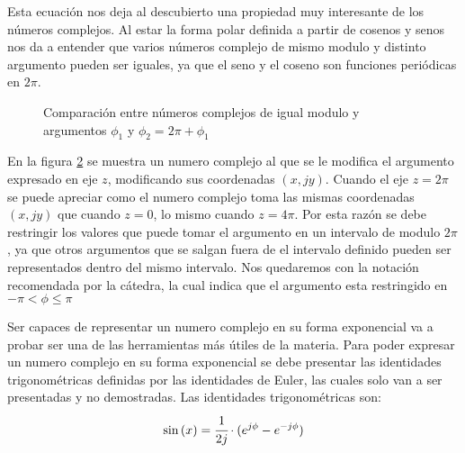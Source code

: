Esta ecuación nos deja al descubierto una propiedad muy interesante de los números complejos. Al estar la forma polar definida a partir de cosenos y senos nos da a entender que varios números complejo de mismo modulo y distinto argumento pueden ser iguales, ya que el seno y el coseno son funciones periódicas en $2\pi$. 
\begin{figure}[H]%
\centering
    \begin{minipage}{0.5\textwidth}
    \centering
        
    \end{minipage}%
    \begin{minipage}{0.4\textwidth}
    \centering
       
    \label{fig:Perz}
    \end{minipage}%
    \caption{Comparación entre números complejos de igual modulo y argumentos $\phi_1$ y $\phi_2=2\pi+\phi_1$}
    \label{fig:Perio}
\end{figure}
\begin{figure}[H]
\centering
    
    \label{fig:PerioC3}
\end{figure}
En la figura \ref{fig:PerioC3} se muestra un numero complejo al que se le modifica el argumento expresado en eje $z$, modificando sus coordenadas $(x,jy)$. Cuando el eje $z=2\pi$ se puede apreciar como el numero complejo toma las mismas coordenadas $(x,jy)$ que cuando $z=0$, lo mismo cuando $z=4\pi$.  
Por esta razón se debe restringir los valores que puede tomar el argumento en un intervalo de modulo $2\pi$, ya que otros argumentos que se salgan fuera de el intervalo definido pueden ser representados dentro del mismo intervalo. Nos quedaremos con la notación recomendada por la cátedra, la cual indica que el argumento esta restringido en $-\pi<\phi\leq\pi$
\begin{figure}[H]
    \centering
        
    \label{fig:interphi}
\end{figure}
Ser capaces de representar un numero complejo en su forma exponencial va a probar ser una de las herramientas más útiles de la materia. Para poder expresar un numero complejo en su forma exponencial se debe presentar las identidades trigonométricas definidas por las identidades de Euler, las cuales solo van a ser presentadas y no demostradas.
Las identidades trigonométricas son:
\begin{equation}\label{eq:eulers}
    \sin{(x)}=\cfrac{1}{2j}\cdot(e^{j\phi}-e^{-j\phi})
\end{equation}
